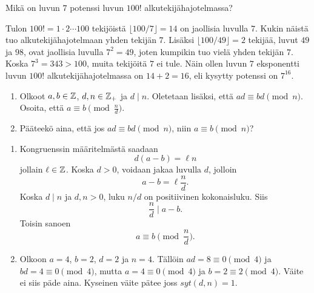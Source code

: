 \documentclass[11pt,a4paper]{amsart}
\begin{document}
\begin{exercise}
  Mikä on luvun \(7\) potenssi luvun \(100!\) alkutekijähajotelmassa?
\end{exercise}

\begin{solution}
  Tulon \(100! = 1 \cdot 2 \cdots 100\) tekijöistä
  \(\lfloor 100/7 \rfloor = 14\) on jaollisia luvulla \(7\).
  Kukin näistä tuo alkutekijähajotelmaan yhden tekijän \(7\).
  Lisäksi \(\lfloor 100/49 \rfloor = 2\) tekijää, luvut \(49\) ja \(98\),
  ovat jaollisia luvulla \(7^2 = 49\), joten kumpikin tuo vielä yhden
  tekijän \(7\). Koska \(7^3 = 343 > 100\), muita tekijöitä \(7\)
  ei tule. Näin ollen luvun \(7\) eksponentti luvun \(100!\)
  alkutekijähajotelmassa on \(14 + 2 = 16\), eli kysytty potenssi on
  \(7^{16}\).
\end{solution}

\begin{exercise}
  \leavevmode\par
  \begin{enumerate}[label=(\alph*), nosep]
    \item Olkoot \(a, b \in \mathbb{Z}\), \(d, n \in \mathbb{Z}_+\) ja \(d \mid n\).
      Oletetaan lisäksi, että \(ad \equiv bd \pmod{n}\). Osoita, että
      \(a \equiv b \pmod{\frac{n}{d}}\).
    \item Pääteekö aina, että jos \(ad \equiv bd \pmod{n}\), niin
      \(a \equiv b \pmod{n}\)?
  \end{enumerate}
\end{exercise}

\begin{solution}
  \leavevmode\par
  \begin{enumerate}[label=(\alph*), nosep]
    \item Kongruenssin määritelmästä saadaan
      \[
        d(a - b) = \ell n
      \]
      jollain \(\ell \in \mathbb{Z}\). Koska \(d > 0\), voidaan jakaa luvulla
      \(d\), jolloin
      \[
        a - b = \ell \frac{n}{d}.
      \]
      Koska \(d \mid n\) ja \(d, n > 0\), luku \(n/d\) on positiivinen
      kokonaisluku. Siis
      \[
        \frac{n}{d} \mid a - b.
      \]
      Toisin sanoen
      \[
        a \equiv b \pmod{\frac{n}{d}}.
      \]
    \item Olkoon \(a = 4\), \(b = 2\), \(d = 2\) ja \(n = 4\). Tällöin
      \(ad = 8 \equiv 0 \pmod{4}\) ja \(bd = 4 \equiv 0 \pmod{4}\), mutta
      \(a = 4 \equiv 0 \pmod{4}\) ja \(b = 2 \equiv 2 \pmod{4}\). Väite
      ei siis päde aina. Kyseinen väite pätee joss \(syt(d, n) = 1\).
  \end{enumerate}
\end{solution}
\end{document}
